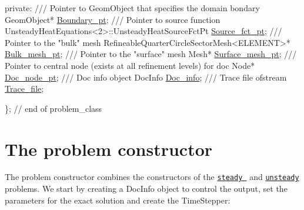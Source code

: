 \begin{DoxyCodeInclude}
\textcolor{keyword}{private}:
\textcolor{comment}{}
\textcolor{comment}{ /// Pointer to GeomObject that specifies the domain bondary}
\textcolor{comment}{} GeomObject* \hyperlink{classRefineableUnsteadyHeatProblem_a368512778fbfd59e918104340466b1df}{Boundary\_pt};
\textcolor{comment}{}
\textcolor{comment}{ /// Pointer to source function}
\textcolor{comment}{} UnsteadyHeatEquations<2>::UnsteadyHeatSourceFctPt \hyperlink{classRefineableUnsteadyHeatProblem_a99eb5a2cd4b680b4f83e739bd4e16639}{Source\_fct\_pt};
\textcolor{comment}{}
\textcolor{comment}{ /// Pointer to the "bulk" mesh}
\textcolor{comment}{} RefineableQuarterCircleSectorMesh<ELEMENT>* \hyperlink{classRefineableUnsteadyHeatProblem_afade341e03a4c97e62444c80adc9552f}{Bulk\_mesh\_pt};
\textcolor{comment}{}
\textcolor{comment}{ /// Pointer to the "surface" mesh}
\textcolor{comment}{} Mesh* \hyperlink{classRefineableUnsteadyHeatProblem_a2febbb317a74e427bf6304235d779fe6}{Surface\_mesh\_pt};
\textcolor{comment}{}
\textcolor{comment}{ /// Pointer to central node (exists at all refinement levels) for doc}
\textcolor{comment}{} Node* \hyperlink{classRefineableUnsteadyHeatProblem_a7ff1982af5819bab492c693178be0c24}{Doc\_node\_pt};
\textcolor{comment}{}
\textcolor{comment}{ /// Doc info object}
\textcolor{comment}{} DocInfo \hyperlink{classRefineableUnsteadyHeatProblem_a9ea9d79a57cb16a6292a637965767f7e}{Doc\_info};
\textcolor{comment}{}
\textcolor{comment}{ /// Trace file}
\textcolor{comment}{} ofstream \hyperlink{classRefineableUnsteadyHeatProblem_a8f62ba78fb856d2e07b00254ca7a0e6a}{Trace\_file};

\}; \textcolor{comment}{// end of problem\_class}

\end{DoxyCodeInclude}




 

\hypertarget{index_constructor}{}\section{The problem constructor}\label{index_constructor}
The problem constructor combines the constructors of the \href{../../../poisson/two_d_poisson_flux_bc_adapt/html/index.html}{\tt steady } and \href{../../two_d_unsteady_heat/html/index.html}{\tt unsteady} problems. We start by creating a {\ttfamily Doc\+Info} object to control the output, set the parameters for the exact solution and create the {\ttfamily Time\+Stepper\+:} 


